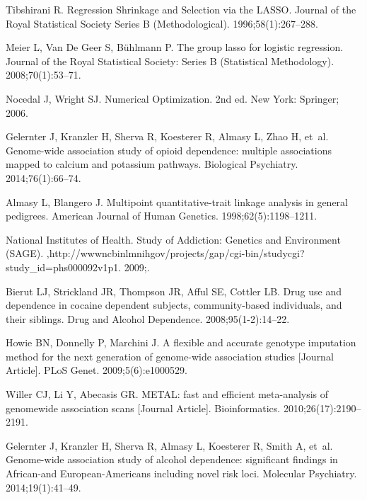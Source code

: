 \documentclass[10pt,letterpaper]{article}
\begin{document}
\begin{thebibliography}{10}
Tibshirani R.
\newblock Regression Shrinkage and Selection via the {LASSO}.
\newblock Journal of the Royal Statistical Society Series B (Methodological).
  1996;58(1):267--288.

Meier L, {Van De Geer} S, B\"{u}hlmann P.
\newblock The group lasso for logistic regression.
\newblock Journal of the Royal Statistical Society: Series B (Statistical
  Methodology). 2008;70(1):53--71.

Nocedal J, Wright SJ.
\newblock Numerical Optimization.
\newblock 2nd ed. New York: Springer; 2006.

Gelernter J, Kranzler H, Sherva R, Koesterer R, Almasy L, Zhao H, et~al.
\newblock Genome-wide association study of opioid dependence: multiple
  associations mapped to calcium and potassium pathways.
\newblock Biological Psychiatry. 2014;76(1):66--74.

Almasy L, Blangero J.
\newblock Multipoint quantitative-trait linkage analysis in general pedigrees.
\newblock American Journal of Human Genetics. 1998;62(5):1198--1211.

{National Institutes of Health}.
\newblock Study of Addiction: Genetics and Environment {(SAGE)}.
,{http://wwwncbinlmnihgov/projects/gap/cgi-bin/studycgi?study\_id=phs000092v1p1}.
  2009;.

Bierut LJ, Strickland JR, Thompson JR, Afful SE, Cottler LB.
\newblock Drug use and dependence in cocaine dependent subjects,
  community-based individuals, and their siblings.
\newblock Drug and Alcohol Dependence. 2008;95(1-2):14--22.

Howie BN, Donnelly P, Marchini J.
\newblock A flexible and accurate genotype imputation method for the next
  generation of genome-wide association studies [Journal Article].
\newblock PLoS Genet. 2009;5(6):e1000529.

Willer CJ, Li Y, Abecasis GR.
\newblock METAL: fast and efficient meta-analysis of genomewide association
  scans [Journal Article].
\newblock Bioinformatics. 2010;26(17):2190--2191.

Gelernter J, Kranzler H, Sherva R, Almasy L, Koesterer R, Smith A, et~al.
\newblock Genome-wide association study of alcohol dependence: significant
  findings in African-and European-Americans including novel risk loci.
\newblock Molecular Psychiatry. 2014;19(1):41--49.


\end{thebibliography}
\end{document}
